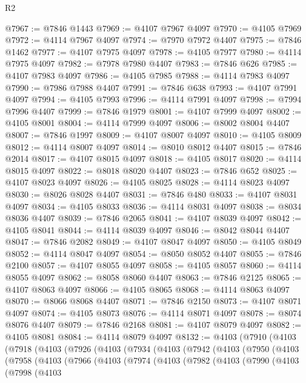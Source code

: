 \begin{lexlean}{R2}
\begin{coremodule}
@7967 := @7846 @1443
@7969 := @4107 @7967 @4097
@7970 := @4105 @7969
@7972 := @4114 @7967 @4097
@7974 := @7970 @7972 @4407
@7975 := @7846 @1462
@7977 := @4107 @7975 @4097
@7978 := @4105 @7977
@7980 := @4114 @7975 @4097
@7982 := @7978 @7980 @4407
@7983 := @7846 @626
@7985 := @4107 @7983 @4097
@7986 := @4105 @7985
@7988 := @4114 @7983 @4097
@7990 := @7986 @7988 @4407
@7991 := @7846 @638
@7993 := @4107 @7991 @4097
@7994 := @4105 @7993
@7996 := @4114 @7991 @4097
@7998 := @7994 @7996 @4407
@7999 := @7846 @1979
@8001 := @4107 @7999 @4097
@8002 := @4105 @8001
@8004 := @4114 @7999 @4097
@8006 := @8002 @8004 @4407
@8007 := @7846 @1997
@8009 := @4107 @8007 @4097
@8010 := @4105 @8009
@8012 := @4114 @8007 @4097
@8014 := @8010 @8012 @4407
@8015 := @7846 @2014
@8017 := @4107 @8015 @4097
@8018 := @4105 @8017
@8020 := @4114 @8015 @4097
@8022 := @8018 @8020 @4407
@8023 := @7846 @652
@8025 := @4107 @8023 @4097
@8026 := @4105 @8025
@8028 := @4114 @8023 @4097
@8030 := @8026 @8028 @4407
@8031 := @7846 @480
@8033 := @4107 @8031 @4097
@8034 := @4105 @8033
@8036 := @4114 @8031 @4097
@8038 := @8034 @8036 @4407
@8039 := @7846 @2065
@8041 := @4107 @8039 @4097
@8042 := @4105 @8041
@8044 := @4114 @8039 @4097
@8046 := @8042 @8044 @4407
@8047 := @7846 @2082
@8049 := @4107 @8047 @4097
@8050 := @4105 @8049
@8052 := @4114 @8047 @4097
@8054 := @8050 @8052 @4407
@8055 := @7846 @2100
@8057 := @4107 @8055 @4097
@8058 := @4105 @8057
@8060 := @4114 @8055 @4097
@8062 := @8058 @8060 @4407
@8063 := @7846 @2125
@8065 := @4107 @8063 @4097
@8066 := @4105 @8065
@8068 := @4114 @8063 @4097
@8070 := @8066 @8068 @4407
@8071 := @7846 @2150
@8073 := @4107 @8071 @4097
@8074 := @4105 @8073
@8076 := @4114 @8071 @4097
@8078 := @8074 @8076 @4407
@8079 := @7846 @2168
@8081 := @4107 @8079 @4097
@8082 := @4105 @8081
@8084 := @4114 @8079 @4097
@8132 := @4103
    (@7910
      (@4103
        (@7918
          (@4103
            (@7926
              (@4103
                (@7934
                  (@4103
                    (@7942
                      (@4103
                        (@7950
                          (@4103
                            (@7958
                              (@4103
                                (@7966
                                  (@4103
                                    (@7974
                                      (@4103
                                        (@7982
                                          (@4103
                                            (@7990
                                              (@4103
                                                (@7998
                                                  (@4103

\end{coremodule}
\end{lexlean}

